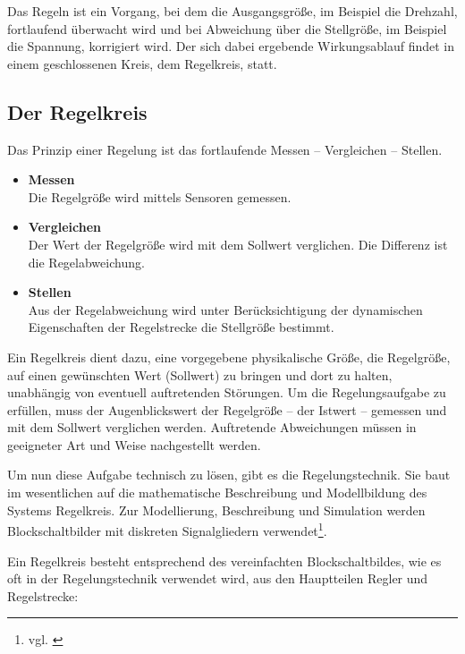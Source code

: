 Das Regeln ist ein Vorgang, bei dem die Ausgangsgröße, im Beispiel die Drehzahl, fortlaufend überwacht wird und bei Abweichung über die Stellgröße, im Beispiel die Spannung, korrigiert wird. Der sich dabei ergebende Wirkungsablauf findet in einem geschlossenen Kreis, dem Regelkreis, statt.
\vspace{5mm}

\subsection{Der Regelkreis}
Das Prinzip einer Regelung ist das fortlaufende Messen – Vergleichen – Stellen.
\\[5mm]

\begin{itemize}
	\item \textbf{Messen}
	\\[1mm] Die Regelgröße wird mittels Sensoren gemessen.
	\medskip
	\item \textbf{Vergleichen}
	\\[1mm] Der Wert der Regelgröße wird mit dem Sollwert verglichen. Die Differenz ist die Regelabweichung.
	\medskip
	\item \textbf{Stellen}
	\\[1mm] Aus der Regelabweichung wird unter Berücksichtigung der dynamischen Eigenschaften der Regelstrecke die Stellgröße bestimmt.
\end{itemize}
\vspace{3mm}

Ein Regelkreis dient dazu, eine vorgegebene physikalische Größe, die Regelgröße, auf einen gewünschten Wert (Sollwert) zu bringen und dort zu halten, unabhängig von eventuell auftretenden Störungen. Um die Regelungsaufgabe zu erfüllen, muss der Augenblickswert der Regelgröße – der Istwert – gemessen und mit dem Sollwert verglichen werden. Auftretende Abweichungen müssen in geeigneter Art und Weise nachgestellt werden.

Um nun diese Aufgabe technisch zu lösen, gibt es die Regelungstechnik. Sie baut im wesentlichen auf die mathematische Beschreibung und Modellbildung des Systems Regelkreis. Zur Modellierung, Beschreibung und Simulation werden Blockschaltbilder mit diskreten Signalgliedern verwendet\footnote{vgl. \cite{Regelungstechnik}}.
	
\newpage

Ein Regelkreis besteht entsprechend des vereinfachten Blockschaltbildes, wie es oft in der Regelungstechnik verwendet wird, aus den Hauptteilen Regler und Regelstrecke:
\\[5mm]

